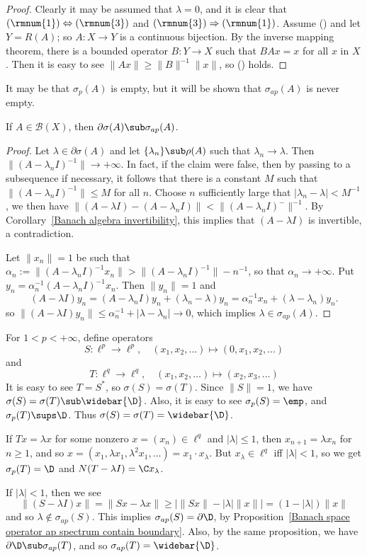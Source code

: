 \begin{proof}
Clearly it may be assumed that $\lambda=0$, and it is clear that $(\rmnum{1})\Leftrightarrow(\rmnum{3})$ and $(\rmnum{3})\Rightarrow(\rmnum{1})$. Assume () and let $Y=R(A)$; so $A:X\to Y$ is a continuous bijection. By the inverse mapping theorem, there is a bounded operator $B:Y\to X$ such that $BAx=x$ for all $x$ in $X$. Then it is easy to see $\|Ax\|\geq\|B\|^{-1}\|x\|$, so () holds.
\end{proof}
It may be that $\sigma_{p}(A)$ is empty, but it will be shown that $\sigma_{ap}(A)$ is never empty.
\begin{proposition}\label{Banach space operator ap spectrum contain boundary}
If $A\in\mathcal{B}(X)$, then $\partial\sigma(A)\sub\sigma_{ap}(A)$.
\end{proposition}
\begin{proof}
Let $\lambda\in\partial\sigma(A)$ and let $\{\lambda_n\}\sub\rho(A)$ such that $\lambda_n\to\lambda$. Then $\|(A-\lambda_nI)^{-1}\|\to+\infty$. In fact, if the claim were false, then by passing to a subsequence if necessary, it follows that there is a constant $M$ such that $\|(A-\lambda_nI)^{-1}\|\leq M$ for all $n$. Choose $n$ sufficiently large that $|\lambda_n-\lambda|<M^{-1}$, we then have $\|(A-\lambda I)-(A-\lambda_nI)\|<\|(A-\lambda_nI)^{-}\|^{-1}$. By Corollary~\ref{Banach algebra invertibility}, this implies that $(A-\lambda I)$ is invertible, a contradiction.\par
Let $\|x_n\|=1$ be such that $\alpha_n:=\|(A-\lambda_nI)^{-1}x_n\|>\|(A-\lambda_nI)^{-1}\|-n^{-1}$, so that $\alpha_n\to+\infty$. Put $y_n=\alpha_n^{-1}(A-\lambda_nI)^{-1}x_n$. Then $\|y_n\|=1$ and
\[(A-\lambda I)y_n=(A-\lambda_nI)y_n+(\lambda_n-\lambda)y_n=\alpha_n^{-1}x_n+(\lambda-\lambda_n)y_n.\]
so $\|(A-\lambda I)y_n\|\leq\alpha_n^{-1}+|\lambda-\lambda_n|\to 0$, which implies $\lambda\in\sigma_{ap}(A)$.
\end{proof}
\begin{example}
For $1<p<+\infty$, define operators
\[S:\ell^p\to\ell^p,\quad (x_1,x_2,\dots)\mapsto(0,x_1,x_2,\dots)\]
and 
\[T:\ell^q\to\ell^q,\quad (x_1,x_2,\dots)\mapsto(x_2,x_3,\dots)\]
It is easy to see $T=S^*$, so $\sigma(S)=\sigma(T)$. Since $\|S\|=1$, we have $\sigma(S)=\sigma(T)\sub\widebar{\D}$. Also, it is easy to see $\sigma_p(S)=\emp$, and $\sigma_p(T)\sups\D$. Thus $\sigma(S)=\sigma(T)=\widebar{\D}$.\par
If $Tx=\lambda x$ for some nonzero $x=(x_n)\in\ell^q$ and $|\lambda|\leq 1$, then $x_{n+1}=\lambda x_n$ for $n\geq 1$, and so $x=(x_1,\lambda x_1,\lambda^2 x_1,\dots)=x_1\cdot x_\lambda$. But $x_\lambda\in\ell^q$ iff $|\lambda|<1$, so we get $\sigma_{p}(T)=\D$ and $N(T-\lambda I)=\C x_\lambda$.\par
If $|\lambda|<1$, then we see
\[\|(S-\lambda I)x\|=\|Sx-\lambda x\|\geq|\|Sx\|-|\lambda|\|x\||=(1-|\lambda|)\|x\|\]
and so $\lambda\notin\sigma_{ap}(S)$. This implies $\sigma_{ap}(S)=\partial\D$, by Proposition~\ref{Banach space operator ap spectrum contain boundary}. Also, by the same proposition, we have $\partial\D\sub\sigma_{ap}(T)$, and so $\sigma_{ap}(T)=\widebar{\D}$.
\end{example}
